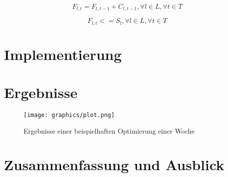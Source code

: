 \begin{equation}
F_{l, t} = F_{l, t-1} + C_{l, t-1}, \forall l \in L, \forall t \in T
\label{fml:constr4}
\end{equation}

\begin{equation}
F_{l, t} <= S_{l}, \forall l \in L, \forall t \in T
\label{fml:constr5}
\end{equation}

\section{Implementierung} \label{str:implementierung}

\section{Ergebnisse} \label{str:ergebnisse}

\begin{figure}[htbp]
\centering
\texttt{[image: graphics/plot.png]}
\caption{Ergebnisse einer beispielhaften Optimierung einer Woche}
\label{img:ergebnisse}
\end{figure}

\section{Zusammenfassung und Ausblick} \label{str:ausblick}





